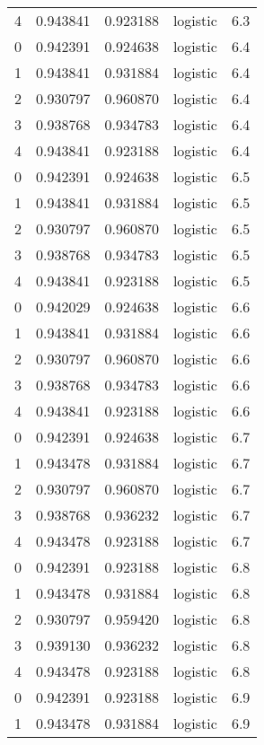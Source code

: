 \begin{tabular}{rrrlr}
     4 & 0.943841 & 0.923188 & logistic &        6.3 \\
     0 & 0.942391 & 0.924638 & logistic &        6.4 \\
     1 & 0.943841 & 0.931884 & logistic &        6.4 \\
     2 & 0.930797 & 0.960870 & logistic &        6.4 \\
     3 & 0.938768 & 0.934783 & logistic &        6.4 \\
     4 & 0.943841 & 0.923188 & logistic &        6.4 \\
     0 & 0.942391 & 0.924638 & logistic &        6.5 \\
     1 & 0.943841 & 0.931884 & logistic &        6.5 \\
     2 & 0.930797 & 0.960870 & logistic &        6.5 \\
     3 & 0.938768 & 0.934783 & logistic &        6.5 \\
     4 & 0.943841 & 0.923188 & logistic &        6.5 \\
     0 & 0.942029 & 0.924638 & logistic &        6.6 \\
     1 & 0.943841 & 0.931884 & logistic &        6.6 \\
     2 & 0.930797 & 0.960870 & logistic &        6.6 \\
     3 & 0.938768 & 0.934783 & logistic &        6.6 \\
     4 & 0.943841 & 0.923188 & logistic &        6.6 \\
     0 & 0.942391 & 0.924638 & logistic &        6.7 \\
     1 & 0.943478 & 0.931884 & logistic &        6.7 \\
     2 & 0.930797 & 0.960870 & logistic &        6.7 \\
     3 & 0.938768 & 0.936232 & logistic &        6.7 \\
     4 & 0.943478 & 0.923188 & logistic &        6.7 \\
     0 & 0.942391 & 0.923188 & logistic &        6.8 \\
     1 & 0.943478 & 0.931884 & logistic &        6.8 \\
     2 & 0.930797 & 0.959420 & logistic &        6.8 \\
     3 & 0.939130 & 0.936232 & logistic &        6.8 \\
     4 & 0.943478 & 0.923188 & logistic &        6.8 \\
     0 & 0.942391 & 0.923188 & logistic &        6.9 \\
     1 & 0.943478 & 0.931884 & logistic &        6.9 \\

\end{tabular}
